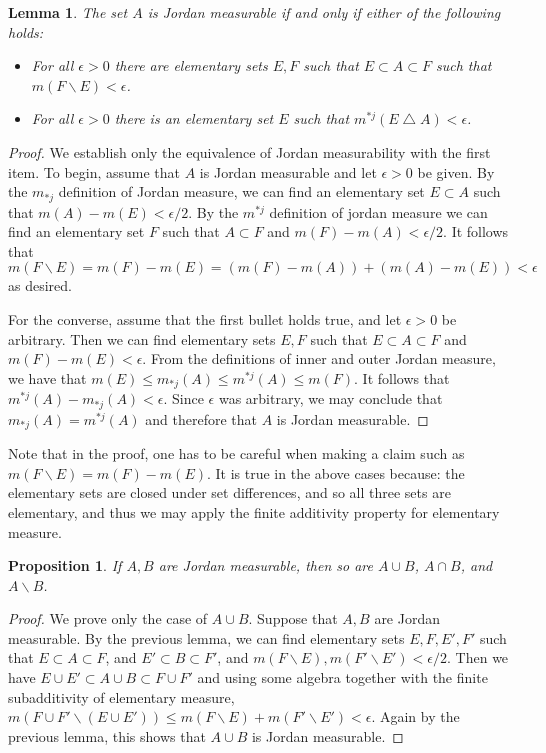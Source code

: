 \documentclass[11pt,oneside]{amsbook}
\renewcommand{\setminus}{\smallsetminus}
\renewcommand{\triangle}{\bigtriangleup}
\theoremstyle{definition}
\theoremstyle{plain}
\newtheorem{lem}[thm]{Lemma}
\newtheorem{prop}[thm]{Proposition}
\theoremstyle{definition}
\theoremstyle{remark}
\numberwithin{equation}{section}
\numberwithin{figure}{section}
\begin{document}
\begin{lem}
  \label{lem:jordan-equiv}
  The set $A$ is Jordan measurable if and only if either of the following holds:
  \begin{itemize}
  \item For all $\epsilon>0$ there are elementary sets $E,F$ such that $E\subset A\subset F$ such that $m(F\setminus E)<\epsilon$.
  \item For all $\epsilon>0$ there is an elementary set $E$ such that $m^{*j}(E\triangle A)<\epsilon$.
  \end{itemize}
\end{lem}

\begin{proof}
  We establish only the equivalence of Jordan measurability with the first item. To begin, assume that $A$ is Jordan measurable and let $\epsilon>0$ be given. By the $m_{*j}$ definition of Jordan measure, we can find an elementary set $E\subset A$ such that $m(A)-m(E)<\epsilon/2$. By the $m^{*j}$ definition of jordan measure we can find an elementary set $F$ such that $A\subset F$ and $m(F)-m(A)<\epsilon/2$. It follows that 
\[m(F\setminus E)=m(F)-m(E)=(m(F)-m(A))+(m(A)-m(E))<\epsilon
\]
as desired.

  For the converse, assume that the first bullet holds true, and let $\epsilon>0$ be arbitrary. Then we can find elementary sets $E,F$ such that $E\subset A\subset F$ and $m(F)-m(E)<\epsilon$. From the definitions of inner and outer Jordan measure, we have that $m(E)\leq m_{*j}(A)\leq m^{*j}(A)\leq m(F)$. It follows that $m^{*j}(A)-m_{*j}(A)<\epsilon$. Since $\epsilon$ was arbitrary, we may conclude that $m_{*j}(A)=m^{*j}(A)$ and therefore that $A$ is Jordan measurable.
\end{proof}

Note that in the proof, one has to be careful when making a claim such as $m(F\setminus E)=m(F)-m(E)$. It is true in the above cases because: the elementary sets are closed under set differences, and so all three sets are elementary, and thus we may apply the finite additivity property for elementary measure.

\begin{prop}
  \label{prop:jordan-closure}
  If $A,B$ are Jordan measurable, then so are $A\cup B$, $A\cap B$, and $A\setminus B$.
\end{prop}

\begin{proof}
  We prove only the case of $A\cup B$. Suppose that $A,B$ are Jordan measurable. By the previous lemma, we can find elementary sets $E,F,E',F'$ such that $E\subset A\subset F$, and $E'\subset B\subset F'$, and $m(F\setminus E),m(F'\setminus E')<\epsilon/2$. Then we have $E\cup E'\subset A\cup B\subset F\cup F'$ and using some algebra together with the finite subadditivity of elementary measure, $m(F\cup F'\setminus(E\cup E'))\leq m(F\setminus E)+m(F'\setminus E')<\epsilon$. Again by the previous lemma, this shows that $A\cup B$ is Jordan measurable.
\end{proof}
\end{document}
